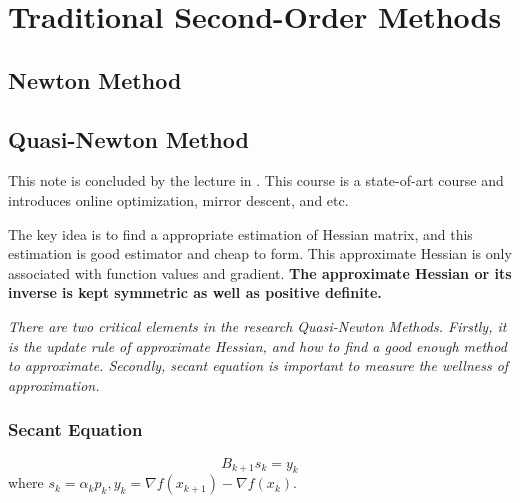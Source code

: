 \ifx\allfiles\undefined


	\else
	\fi
	\chapter{Traditional Second-Order Methods}
	\section{Newton Method}
	
	
	\section{Quasi-Newton Method}
	 This note is concluded by the lecture in \cite{yudongchen2024nonlinearoptimization,arora2004computationalmethodsforunconstrainedminimization}. This course is a state-of-art course and introduces online optimization, mirror descent, and etc.
	
	The key idea is to find a appropriate estimation of Hessian matrix, and this estimation is good estimator and cheap to form. This approximate Hessian is only associated with function values and gradient. \textbf{The approximate Hessian or its inverse is kept symmetric as well as positive definite\cite{arora2004computationalmethodsforunconstrainedminimization}.}
	
	\emph{There are two critical elements in the research Quasi-Newton Methods. Firstly, it is the update rule of approximate Hessian, and how to find a good enough method to approximate. Secondly, secant equation is important to measure the wellness of approximation.}
	
	\subsection{Secant Equation}
	$$
	B_{k+1}s_k=y_k
	$$
	where $s_k=\alpha_k p_k,y_k=\nabla f(x_{k+1})-\nabla f(x_k)$.
	
